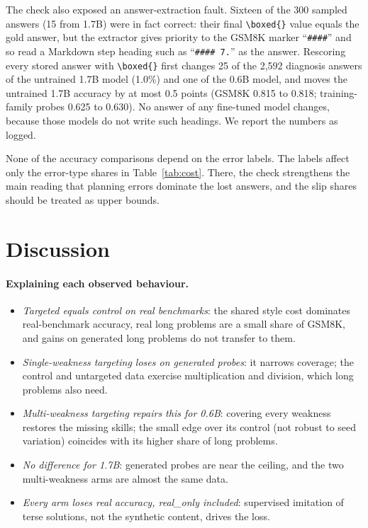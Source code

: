 \documentclass[11pt]{article}
\begin{document}
The check also exposed an answer-extraction fault. Sixteen of the 300 sampled answers (15 from 1.7B) were in fact
correct: their final \verb|\boxed{}| value equals the gold answer, but the extractor gives priority to the GSM8K marker
``\texttt{\#\#\#\#}'' and so read a Markdown step heading such as ``\texttt{\#\#\#\# 7.}'' as the answer. Rescoring
every stored answer with \verb|\boxed{}| first changes 25 of the 2{,}592 diagnosis answers of the untrained 1.7B model
(1.0\%) and one of the 0.6B model, and moves the untrained 1.7B accuracy by at most 0.5 points (GSM8K 0.815 to 0.818;
training-family probes 0.625 to 0.630). No answer of any fine-tuned model changes, because those models do not write
such headings. We report the numbers as logged.

None of the accuracy comparisons depend on the error labels. The labels affect only the error-type shares in
Table~\ref{tab:cost}. There, the check strengthens the main reading that planning errors dominate the lost answers,
and the slip shares should be treated as upper bounds.

\section{Discussion}

\paragraph{Explaining each observed behaviour.}
\begin{itemize}
  \item \emph{Targeted equals control on real benchmarks}: the shared style cost dominates real-benchmark accuracy, real
  long problems are a small share of GSM8K, and gains on generated long problems do not transfer to them.
  \item \emph{Single-weakness targeting loses on generated probes}: it narrows coverage; the control and untargeted data
  exercise multiplication and division, which long problems also need.
  \item \emph{Multi-weakness targeting repairs this for 0.6B}: covering every weakness restores the missing skills; the
  small edge over its control (not robust to seed variation) coincides with its higher share of long problems.
  \item \emph{No difference for 1.7B}: generated probes are near the ceiling, and the two multi-weakness arms are almost
  the same data.
  \item \emph{Every arm loses real accuracy, real\_only included}: supervised imitation of terse solutions, not the
  synthetic content, drives the loss.
\end{itemize}
\end{document}
